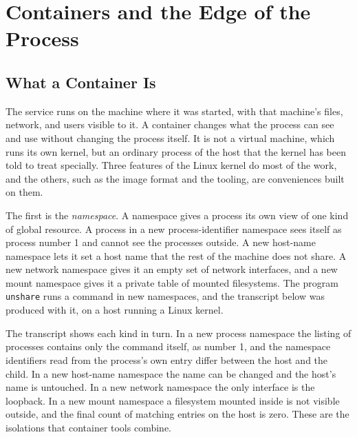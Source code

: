 \chapter{Containers and the Edge of the Process}
\label{ch:containers}

\section{What a Container Is}

The service runs on the machine where it was started, with that machine's files, network, and users visible to it. A container changes what the process can see and use without changing the process itself. It is not a virtual machine, which runs its own kernel, but an ordinary process of the host that the kernel has been told to treat specially. Three features of the Linux kernel do most of the work, and the others, such as the image format and the tooling, are conveniences built on them.

The first is the \emph{namespace}. A namespace gives a process its own view of one kind of global resource. A process in a new process-identifier namespace sees itself as process number 1 and cannot see the processes outside. A new host-name namespace lets it set a host name that the rest of the machine does not share. A new network namespace gives it an empty set of network interfaces, and a new mount namespace gives it a private table of mounted filesystems. The program \texttt{unshare} runs a command in new namespaces, and the transcript below was produced with it, on a host running a Linux kernel.



The transcript shows each kind in turn. In a new process namespace the listing of processes contains only the command itself, as number 1, and the namespace identifiers read from the process's own entry differ between the host and the child. In a new host-name namespace the name can be changed and the host's name is untouched. In a new network namespace the only interface is the loopback. In a new mount namespace a filesystem mounted inside is not visible outside, and the final count of matching entries on the host is zero. These are the isolations that container tools combine.

